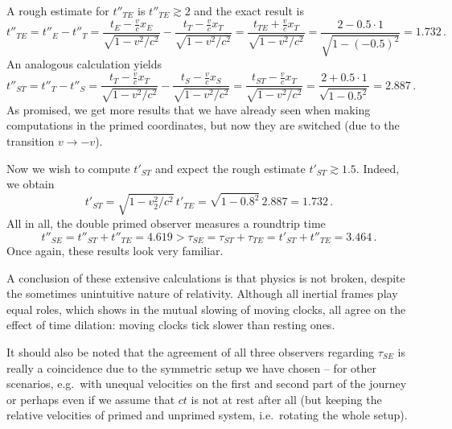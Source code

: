 \begin{ex}
\begin{itemize}
	A rough estimate for $t''_{TE}$ is $t''_{TE} \gtrsim 2$ and the exact result is
	\begin{equation*}
	t''_{TE} = t''_E - t''_T = \frac{t_E - \frac{v}{c} x_E}{\sqrt{1 - v^2 / c^2}} - \frac{t_T - \frac{v}{c} x_T}{\sqrt{1 - v^2 / c^2}} = \frac{t_{TE} + \frac{v}{c} x_T}{\sqrt{1 - v^2 / c^2}} = \frac{2 - 0.5 \cdot 1}{\sqrt{1 - (-0.5)^2}} = 1.732 \, .
	\end{equation*}
	An analogous calculation yields
	\begin{equation*}
	t''_{ST} = t''_T - t''_S = \frac{t_T - \frac{v}{c} x_T}{\sqrt{1 - v^2 / c^2}} - \frac{t_S - \frac{v}{c} x_S}{\sqrt{1 - v^2 / c^2}} = \frac{t_{ST} - \frac{v}{c} x_T}{\sqrt{1 - v^2 / c^2}} = \frac{2 + 0.5 \cdot 1}{\sqrt{1 - 0.5^2}} = 2.887 \, .
	\end{equation*}
	As promised, we get more results that we have already seen when making computations in the primed coordinates, but now they are switched (due to the transition $v \rightarrow -v$).

	Now we wish to compute $t'_{ST}$ and expect the rough estimate $t'_{ST} \gtrsim 1.5$. Indeed, we obtain
	\begin{equation*}
	t'_{ST} = \sqrt{1 - v_2^2 / c^2} \, t'_{TE} = \sqrt{1 - 0.8^2} \, 2.887 = 1.732 \, .
	\end{equation*}
	All in all, the double primed observer measures a roundtrip time
	\begin{equation*}
	t''_{SE} = t''_{ST} + t''_{TE} = 4.619 > \tau_{SE} = \tau_{ST} + \tau_{TE} = t'_{ST} + t''_{TE} = 3.464 \, .
	\end{equation*}
	Once again, these results look very familiar. 
\end{itemize}

A conclusion of these extensive calculations is that physics is not broken, despite the sometimes unintuitive nature of relativity. Although all inertial frames play equal roles, which shows in the mutual slowing of moving clocks, all agree on the effect of time dilation: moving clocks tick slower than resting ones.

It should also be noted that the agreement of all three observers regarding $\tau_{SE}$ is really a coincidence due to the symmetric setup we have chosen -- for other scenarios, e.g.~with unequal velocities on the first and second part of the journey or perhaps even if we assume that $ct$ is not at rest after all (but keeping the relative velocities of primed and unprimed system, i.e.~rotating the whole setup).
\end{ex}

